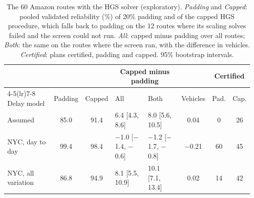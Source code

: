 \begin{table}[t]
\centering
\small
\setlength{\tabcolsep}{3.5pt}
\caption{The 60 Amazon routes with the HGS solver (exploratory). \emph{Padding} and \emph{Capped}: pooled validated reliability (\%) of 20\% padding and of the capped HGS procedure, which falls back to padding on the 12 routes where its scaling solves failed and the screen could not run. \emph{All}: capped minus padding over all routes; \emph{Both}: the same on the routes where the screen ran, with the difference in vehicles. \emph{Certified}: plans certified, padding and capped. 95\% bootstrap intervals.}
\label{tab:amazonhgs}
\begin{tabular}{@{}lccllccc@{}}
\toprule
 & & & \multicolumn{2}{c}{Capped minus padding} & & \multicolumn{2}{c}{Certified}\\
\cmidrule(lr){4-5}\cmidrule(lr){7-8}
Delay model & Padding & Capped & All & Both & Vehicles & Pad. & Cap.\\
\midrule
Assumed & 85.0 & 91.4 & 6.4 [4.3, 8.6] & 8.0 [5.6, 10.5] & 0.04 & 0 & 26\\
NYC, day to day & 99.4 & 98.4 & $-$1.0 [$-$1.4, $-$0.6] & $-$1.2 [$-$1.7, $-$0.8] & $-$0.21 & 60 & 45\\
NYC, all variation & 86.8 & 94.9 & 8.1 [5.5, 10.9] & 10.1 [7.1, 13.4] & 0.02 & 14 & 42\\
\bottomrule
\end{tabular}
\end{table}
